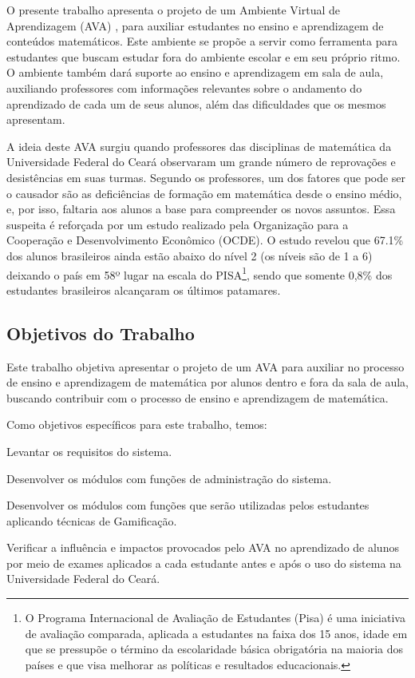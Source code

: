 O presente trabalho apresenta o projeto de um Ambiente Virtual de Aprendizagem (AVA) \cite{valentini2010aprendizagem}, para auxiliar estudantes no ensino e aprendizagem de conteúdos matemáticos. Este 
ambiente se propõe a servir como ferramenta para estudantes que buscam estudar fora do ambiente escolar e em seu próprio ritmo. O ambiente também dará suporte ao ensino e aprendizagem em sala de 
aula, auxiliando professores com informações relevantes sobre o andamento do aprendizado de cada um de seus alunos, além das dificuldades que os mesmos apresentam.

A ideia deste AVA surgiu quando professores das disciplinas de matemática da Universidade Federal do Cear\'a observaram um grande número de reprovações e desistências em suas turmas. Segundo os 
professores, um dos fatores que pode ser o causador são as deficiências de formação em matemática desde o ensino médio, e, por isso, faltaria aos alunos a base para compreender os novos assuntos. Essa 
suspeita é reforçada por um estudo realizado pela Organização para a Cooperação e Desenvolvimento Econômico (OCDE)\cite{pisainfocus2016}. O estudo revelou que 67.1\% dos alunos brasileiros ainda estão 
abaixo do nível 2 (os níveis são de 1 a 6) deixando o país em 58º lugar na escala do PISA\footnote{O Programa Internacional de Avaliação de Estudantes (Pisa) é uma iniciativa de avaliação comparada, 
aplicada a estudantes na faixa dos 15 anos, idade em que se pressupõe o término da escolaridade básica obrigatória na maioria dos países e que visa melhorar as políticas e resultados educacionais.}, 
sendo que somente 0,8\% dos estudantes brasileiros alcançaram os últimos patamares.

\subsection{Objetivos do Trabalho}

Este trabalho objetiva apresentar o projeto de um AVA para auxiliar no processo de ensino e aprendizagem de matemática por alunos dentro e fora da sala de aula, buscando contribuir com o 
processo de ensino e aprendizagem de matem\'atica. 

Como objetivos específicos para este trabalho, temos: 
\begin{alineas}
	\item Levantar os requisitos do sistema.
	\item Desenvolver os módulos com funções de administração do sistema.
    \item Desenvolver os módulos com funções que serão utilizadas pelos estudantes aplicando técnicas de Gamificação.
    \item Verificar a influência e impactos provocados pelo AVA no aprendizado de alunos por meio de exames aplicados a cada estudante antes e após o uso do sistema na Universidade Federal do Ceará.
\end{alineas}


